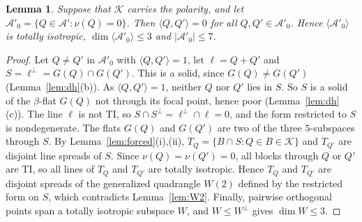 \documentclass[11pt]{amsart}
\newtheorem{lemma}[theorem]{Lemma}
\theoremstyle{definition}
\newcommand{\K}{\mathcal{K}}
\newcommand{\A}{\mathcal{A}}
\begin{document}
\begin{lemma}\label{lem:A0}
Suppose that $\K$ carries the polarity, and let $\A'_0=\{Q\in\A':\nu(Q)=0\}$. Then $\langle Q,Q'\rangle=0$ for all $Q,Q'\in\A'_0$. Hence $\langle\A'_0\rangle$ is totally isotropic, $\dim\langle\A'_0\rangle\le3$ and $|\A'_0|\le7$.
\end{lemma}
\begin{proof}
Let $Q\ne Q'$ in $\A'_0$ with $\langle Q,Q'\rangle=1$, let $\ell=Q+Q'$ and $S=\ell^\perp=G(Q)\cap G(Q')$. This is a solid, since $G(Q)\ne G(Q')$ (Lemma~\ref{lem:dh}(b)). As $\langle Q,Q'\rangle=1$, neither $Q$ nor $Q'$ lies in $S$. So $S$ is a solid of the $\beta$-flat $G(Q)$ not through its focal point, hence poor (Lemma~\ref{lem:dh}(c)). The line $\ell$ is not TI, so $S\cap S^\perp=\ell^\perp\cap\ell=0$, and the form restricted to $S$ is nondegenerate. The flats $G(Q)$ and $G(Q')$ are two of the three $5$-subspaces through $S$. By Lemma~\ref{lem:forced}(i),(ii), $T_Q=\{B\cap S:Q\in B\in\K\}$ and $T_{Q'}$ are disjoint line spreads of $S$. Since $\nu(Q)=\nu(Q')=0$, all blocks through $Q$ or $Q'$ are TI, so all lines of $T_Q$ and $T_{Q'}$ are totally isotropic. Hence $T_Q$ and $T_{Q'}$ are disjoint spreads of the generalized quadrangle $W(2)$ defined by the restricted form on $S$, which contradicts Lemma~\ref{lem:W2}. Finally, pairwise orthogonal points span a totally isotropic subspace $W$, and $W\le W^\perp$ gives $\dim W\le3$.
\end{proof}
\end{document}
